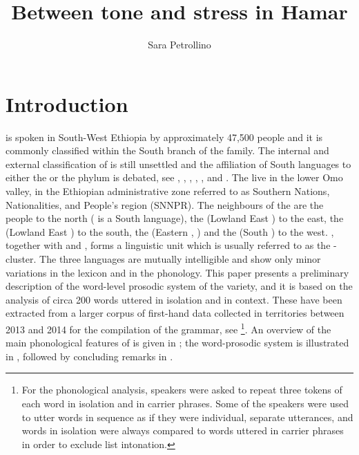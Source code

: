 \documentclass[output=paper]{LSP/langsci}
\author{Sara Petrollino
\affiliation{Laboratoire Dynamique Du Langage, Lyon and Leiden University}
}
\title{Between tone and stress in Hamar}
\begin{document}
\section{Introduction} \label{sec:Petrollino:1}
 is spoken in South-West Ethiopia by approximately 47,500 people \citep{SimonsFenning2017} and it is commonly classified within the South  branch of the  family. The internal and external classification of  is still unsettled and the affiliation of South  languages to either the  or the  phylum is debated, see \citet{Zaborski2004}, \citet{Blažek2008}, \citet{Bender2000, Bender2003}, \citet{Hayward2003}, \citet{Fleming1974}, and \citet{Azeb2012}. The  live in the lower Omo valley, in the Ethiopian administrative zone referred to as Southern Nations, Nationalities, and People's region (SNNPR). The neighbours of the  are the  people to the north ( is a South  language), the  (Lowland East ) to the east, the  (Lowland East ) to the south, the  (Eastern , ) and the  (South ) to the west. , together with  and , forms a linguistic unit which is usually referred to as the - cluster. The three languages are mutually intelligible and show only minor variations in the lexicon and in the phonology. This paper presents a preliminary description of the word-level prosodic system of the  variety, and it is based on the analysis of circa 200  words uttered in isolation and in context. These have been extracted from a larger corpus of first-hand data collected in  territories between 2013 and 2014 for the compilation of the  grammar, see \citet{Petrollino2016}\footnote{For the phonological analysis, speakers were asked to repeat three tokens of each word in isolation and in carrier phrases. Some of the speakers were used to utter words in sequence as if they were individual, separate utterances, and words in isolation were always compared to words uttered in carrier phrases in order to exclude list intonation.}. An overview of the main phonological features of  is given in ; the word-prosodic system is illustrated in , followed by concluding remarks in .  
\end{document}
